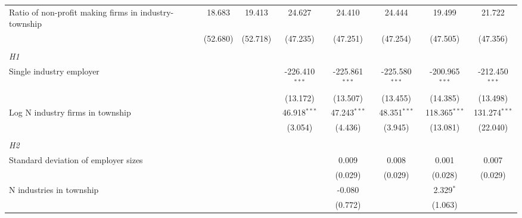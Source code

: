 \begin{tabular}{lcccccccc}
   Ratio of non-profit making firms in industry-township &                 & 18.683          & 19.413          & 24.627           & 24.410           & 24.444           & 19.499           & 21.722\\   
                                                         &                 & (52.680)        & (52.718)        & (47.235)         & (47.251)         & (47.254)         & (47.505)         & (47.356)\\   
\hdashline %
\\[0.1ex] %
\emph{H1} \\ 
   Single industry employer                              &                 &                 &                 & -226.410$^{***}$ & -225.861$^{***}$ & -225.580$^{***}$ & -200.965$^{***}$ & -212.450$^{***}$\\   
                                                         &                 &                 &                 & (13.172)         & (13.507)         & (13.455)         & (14.385)         & (13.498)\\   
   Log N industry firms in township                      &                 &                 &                 & 46.918$^{***}$   & 47.243$^{***}$   & 48.351$^{***}$   & 118.365$^{***}$  & 131.274$^{***}$\\   
                                                         &                 &                 &                 & (3.054)          & (4.436)          & (3.945)          & (13.081)         & (22.040)\\   
\hdashline %
\\[0.1ex] %
\emph{H2} \\ 
   Standard deviation of employer sizes                  &                 &                 &                 &                  & 0.009            & 0.008            & 0.001            & 0.007\\   
                                                         &                 &                 &                 &                  & (0.029)          & (0.029)          & (0.028)          & (0.029)\\   
   N industries in township                              &                 &                 &                 &                  & -0.080           &                  & 2.329$^{*}$      &   \\   
                                                         &                 &                 &                 &                  & (0.772)          &                  & (1.063)          &   \\   

\end{tabular}
